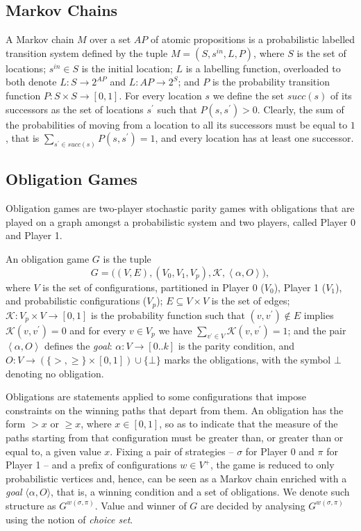 \documentclass[a4paper,UKenglish]{oasics-v2016}
\begin{document}
\subsection{Markov Chains}
A Markov chain $M$ over a set $AP$ of atomic propositions is a
probabilistic labelled transition system defined by the tuple $M=(S,
s^{in}, L, P)$, where $S$ is the set of locations; $s^{in} \in S$ is
the initial location; $L$ is a labelling function, overloaded to both
denote $L: S \rightarrow 2^{AP}$ and $L: AP \rightarrow 2^S$; and $P$
is the probability transition function $P: S \times S \rightarrow
[0,1]$. 
For every location $s$ we define the set $succ(s)$ of its successors as the set 
of locations $s^\prime$ such that $P(s,s^\prime)>0$.
Clearly, the sum of the probabilities of moving from a location to all its 
successors must be equal to $1$, that is $\textstyle\sum_{s^\prime \in succ(s)} 
P(s,s^\prime) = 1$, and every location has at least one successor.
%
%
\subsection{Obligation Games}
Obligation games \cite{CP13} are two-player stochastic parity games with 
obligations that are played on a graph amongst a probabilistic system and two 
players, called Player 0 and Player 1.
\begin{definition}
	An obligation game $G$ is the tuple $$G = \big((V, E),(V_0, V_1, 
	V_p),\mathcal{K}, \left\langle \alpha, O \right\rangle \big),$$ where $V$ 
	is 
	the set of configurations, partitioned in Player 0 ($V_0$), Player 1 
	($V_1$), 
	and probabilistic configurations ($V_p$); $E \subseteq V \times V$ is the 
	set 
	of edges; $\mathcal{K}: V_p\times V \rightarrow [0,1]$ is the probability 
	function such that $(v,v^\prime)\notin E$ implies
	$\mathcal{K}(v,v^\prime)=0$ and for every $v\in V_p$ we have
	$\textstyle\sum_{v^\prime\in V}\mathcal{K}(v,v^\prime)=1$;
	and the pair $\left\langle \alpha, O \right\rangle$ defines the 
	\emph{goal}: 
	$\alpha : V \rightarrow [0..k]$ is the parity condition, and $O : V 
	\rightarrow 
	(\lbrace >, \geq \rbrace \times [0,1]) \cup \lbrace \bot\rbrace $ marks the 
	obligations, with the symbol $\bot$ denoting no obligation.
\end{definition}
Obligations are statements applied to some configurations that impose 
constraints on the winning paths that depart from them.
An obligation has the form $>\!x$ or $\geq\!x$, where $x \in [0,1]$, so as to 
indicate that the measure of the paths starting from that configuration must be 
greater than, or greater than or equal to, a given value $x$.
Fixing a pair of strategies -- $\sigma$ for Player 0 and $\pi$ for Player 1 -- 
and a prefix of configurations $w\in V^+$, the game is reduced to only 
probabilistic vertices and, hence, can be seen as a Markov chain enriched with 
a \emph{goal} $\langle \alpha,O\rangle$, that is, a winning condition and a set 
of obligations.
We denote such structure as $G^{w(\sigma,\pi)}$.
Value and winner of $G$ are decided by analysing $G^{w(\sigma,\pi)}$ using the 
notion of \emph{choice set}.
\end{document}
